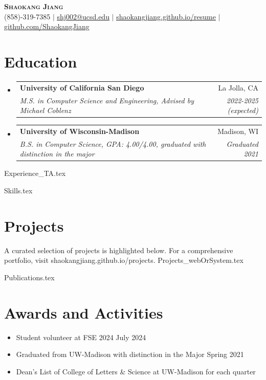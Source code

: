 \documentclass[letterpaper,11pt]{article}
\makeatletter
\newcommand{\resumeItem}[1]{
  \item\small{
    {#1 \vspace{-2pt}}
  }
}
\newcommand{\resumeSubheading}[4]{
  \vspace{-2pt}\item
    \begin{tabular*}{0.97\textwidth}[t]{l@{\extracolsep{\fill}}r}
      \textbf{#1} & #2 \\
      \textit{\small#3} & \textit{\small #4} \\
    \end{tabular*}\vspace{-7pt}
}
\newcommand{\resumeSubHeadingListStart}{\begin{itemize}[leftmargin=0.12in, label={}]}
\newcommand{\resumeSubHeadingListEnd}{\end{itemize}}
\newcommand{\resumeItemListStart}{\begin{itemize}}
\newcommand{\resumeItemListEnd}{\end{itemize}\vspace{-5pt}}
\makeatother
\begin{document}

\begin{center}
    \textbf{\Huge \scshape Shaokang Jiang} \\ \vspace{1pt}
    \small (858)-319-7385 $|$ \href{mailto:shj002@ucsd.edu}{\underline{shj002@ucsd.edu}} $|$ 
    \href{https://shaokangjiang.github.io/resume}{\underline{shaokangjiang.github.io/resume}} $|$
    \href{https://github.com/ShaokangJiang}{\underline{github.com/ShaokangJiang}}
\end{center}


\section{Education}
  \resumeSubHeadingListStart
    \resumeSubheading
      {University of California San Diego}{La Jolla, CA}
      {M.S. in Computer Science and Engineering, Advised by Michael Coblenz}{2022-2025 (expected)}
    \resumeSubheading
      {University of Wisconsin-Madison}{Madison, WI}
      {B.S. in Computer Science, GPA: 4.00/4.00, graduated with distinction in the major}{Graduated 2021}
  \resumeSubHeadingListEnd


  
{Experience_TA.tex}

%
{Skills.tex}


\section{Projects}

A curated selection of projects is highlighted below. For a comprehensive portfolio, visit shaokangjiang.github.io/projects.
\vspace{0.5em}
{Projects_webOrSystem.tex}


% 
{Publications.tex}


\section{Awards and Activities}

\resumeItemListStart
\resumeItem{Student volunteer at FSE 2024 \hfill July 2024}
\resumeItem{Graduated from UW-Madison with distinction in the Major \hfill Spring 2021}
\resumeItem{Dean's List of College of Letters \& Science at UW-Madison for each quarter}
\resumeItemListEnd


\end{document}
